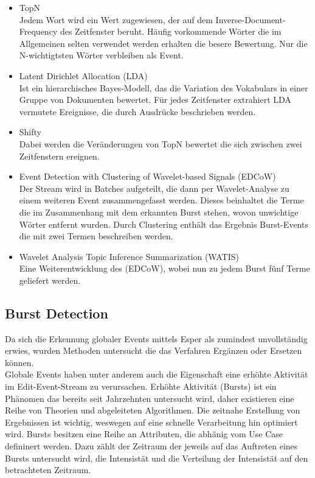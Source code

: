 \begin{itemize}
\item TopN\\Jedem Wort wird ein Wert zugewiesen, der auf dem Inverse-Document-Frequency des Zeitfenster beruht. Häufig vorkommende Wörter die im Allgemeinen selten verwendet werden erhalten die besere Bewertung. Nur die N-wichtigtsten Wörter verbleiben als Event.
\item Latent Dirichlet Allocation (LDA)\\Ist ein hierarchisches Bayes-Modell, das die Variation des Vokabulars in einer Gruppe von Dokumenten bewertet. Für jedes Zeitfenster extrahiert LDA  vermutete Ereignisse, die durch Ausdrücke beschrieben werden. 
\item Shifty\\Dabei werden die Veränderungen von TopN bewertet die sich zwischen zwei Zeitfenstern ereignen.
\item Event Detection with Clustering of
Wavelet-based Signals (EDCoW)\\Der Stream wird in Batches aufgeteilt, die dann per Wavelet-Analyse zu einem weiteren Event zusammengefasst werden. Dieses beinhaltet die Terme die im Zusammenhang mit dem erkannten Burst stehen, wovon unwichtige Wörter entfernt wurden. Durch Clustering enthält das Ergebnis Burst-Events die mit zwei Termen beschreiben werden.
\item Wavelet Analysis Topic Inference Summarization
(WATIS)\\ Eine Weiterentwicklung des (EDCoW), wobei nun zu jedem Burst fünf Terme geliefert werden.
\end{itemize}

\subsection{Burst Detection}
Da sich die Erkennung globaler Events mittels Esper als zumindest unvollständig erwies, wurden Methoden untersucht die das Verfahren  Ergänzen oder Ersetzen können.\\

Globale Events haben unter anderem auch die Eigenschaft eine erhöhte Aktivität im Edit-Event-Stream zu verursachen. Erhöhte Aktivität (Bursts) ist ein Phänomen das bereits seit Jahrzehnten untersucht wird, daher existieren eine Reihe von Theorien und abgeleiteten Algorithmen. Die zeitnahe Erstellung von Ergebnissen ist wichtig, weswegen auf eine schnelle Verarbeitung hin optimiert wird. Bursts besitzen eine Reihe an Attributen, die abhänig vom Use Case defininert werden. Dazu zählt der Zeitraum der jeweils auf das Auftreten eines Bursts untersucht wird, die Intensistät und die Verteilung der Intensistät auf den betrachteten Zeitraum.\\

